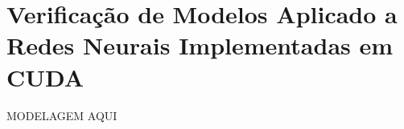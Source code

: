 \chapter{Verificação de Modelos Aplicado a Redes Neurais Implementadas em CUDA} \label{cap3}
MODELAGEM AQUI
